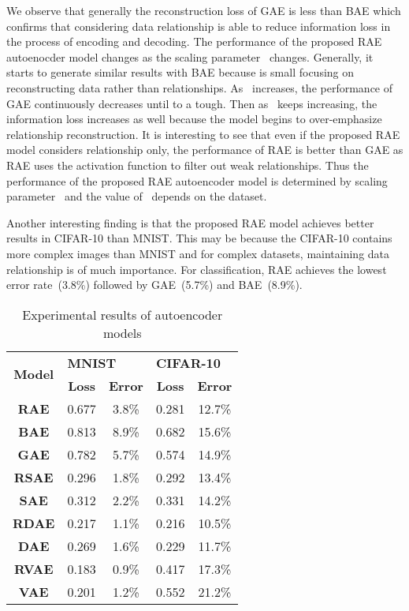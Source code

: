 \documentclass[conference]{IEEEtran}
\begin{document}
	We observe that generally the reconstruction loss of GAE is less than BAE which confirms that considering data relationship is able to reduce information loss in the process of encoding and decoding. The performance of the proposed RAE autoenocder model changes as the scaling parameter~ changes. Generally, it starts to generate similar results with BAE because  is small focusing on reconstructing data rather than relationships. As~ increases, the performance of GAE continuously decreases until to a tough. Then as~ keeps increasing, the information loss increases as well because the model begins to over-emphasize relationship reconstruction. It is interesting to see that even if the proposed RAE model considers relationship only, the performance of RAE is better than GAE as RAE uses the activation function to filter out weak relationships. Thus the performance of the proposed RAE autoencoder model is determined by scaling parameter~ and the value of~ depends on the dataset.
	
	Another interesting finding is that the proposed RAE model achieves better results in CIFAR-10 than MNIST. This may be because the CIFAR-10 contains more complex images than MNIST and for complex datasets, maintaining data relationship is of much importance. For classification, RAE achieves the lowest error rate~(3.8\%) followed by GAE~(5.7\%) and BAE~(8.9\%).
	
	\begin{table}[t]
		\renewcommand{\arraystretch}{1.5}
		\centering
		\caption{Experimental results of autoencoder models}
		\label{my-label}
		\begin{tabular}{|c|c|c|c|c|}
			\hline
			\multirow{2}{*}{\textbf{Model}}
			& \multicolumn{2}{l|}{\textbf{\hspace*{0.6cm}MNIST}}
			& \multicolumn{2}{l|}{\textbf{\hspace*{0.3cm}CIFAR-10}} \\ \cline{2-5}
			& \textbf{Loss} & \textbf{Error}
			& \textbf{Loss} & \textbf{Error}       \\ \hline \hline
			\textbf{RAE}  & 0.677 & 3.8\% & 0.281 & 12.7\% \\ \hline
			\textbf{BAE}  & 0.813 & 8.9\% & 0.682 & 15.6\% \\ \hline
			\textbf{GAE}  & 0.782 & 5.7\% & 0.574 & 14.9\% \\ \hline \hline
			\textbf{RSAE} & 0.296 & 1.8\% & 0.292 & 13.4\% \\ \hline
			\textbf{SAE}  & 0.312 & 2.2\% & 0.331 & 14.2\% \\ \hline \hline
			\textbf{RDAE} & 0.217 & 1.1\% & 0.216 & 10.5\% \\ \hline
			\textbf{DAE}  & 0.269 & 1.6\% & 0.229 & 11.7\% \\ \hline \hline
			\textbf{RVAE} & 0.183 & 0.9\% & 0.417 & 17.3\% \\ \hline
			\textbf{VAE}  & 0.201 & 1.2\% & 0.552 & 21.2\% \\ \hline \hline
		\end{tabular}
	\end{table}
	
\end{document}
